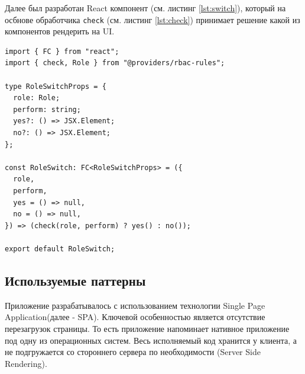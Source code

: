 \documentclass[a4paper,12pt,reqno]{article}
\begin{document}
Далее был разработан React компонент (см. листинг \ref{lst:switch}), который на осбнове обработчика \texttt{check} (см. листинг \ref{lst:check}) принимает решение какой из компонентов рендерить на UI.

\begin{lstlisting}[frame=single, basicstyle=\footnotesize\ttfamily, label={lst:switch}, caption={RoleSwitch React компонент},captionpos=b]
import { FC } from "react";
import { check, Role } from "@providers/rbac-rules";

type RoleSwitchProps = {
  role: Role;
  perform: string;
  yes?: () => JSX.Element;
  no?: () => JSX.Element;
};

const RoleSwitch: FC<RoleSwitchProps> = ({
  role,
  perform,
  yes = () => null,
  no = () => null,
}) => (check(role, perform) ? yes() : no());

export default RoleSwitch;
\end{lstlisting}



\subsection{Используемые паттерны}

Приложение разрабатывалось с использованием технологии Single Page Application(далее - SPA)\cite{spa}. Ключевой особенностью является отсутствие перезагрузок страницы. То есть приложение напоминает нативное приложение под одну из операционных систем. Весь исполняемый код хранится у клиента, а не подгружается со стороннего сервера по необходимости (Server Side Rendering).
\end{document}
